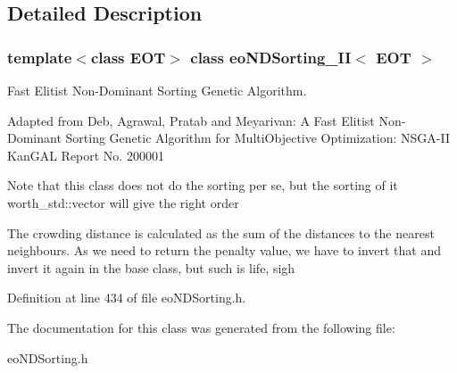 \subsection{Detailed Description}
\subsubsection*{template$<$class EOT$>$ class eo\-NDSorting\_\-II$<$ EOT $>$}

Fast Elitist Non-Dominant Sorting Genetic Algorithm. 

Adapted from Deb, Agrawal, Pratab and Meyarivan: A Fast Elitist Non-Dominant Sorting Genetic Algorithm for Multi\-Objective Optimization: NSGA-II Kan\-GAL Report No. 200001

Note that this class does not do the sorting per se, but the sorting of it worth\_\-std::vector will give the right order

The crowding distance is calculated as the sum of the distances to the nearest neighbours. As we need to return the penalty value, we have to invert that and invert it again in the base class, but such is life, sigh 



Definition at line 434 of file eo\-NDSorting.h.

The documentation for this class was generated from the following file:\begin{CompactItemize}
\item 
eo\-NDSorting.h\end{CompactItemize}
